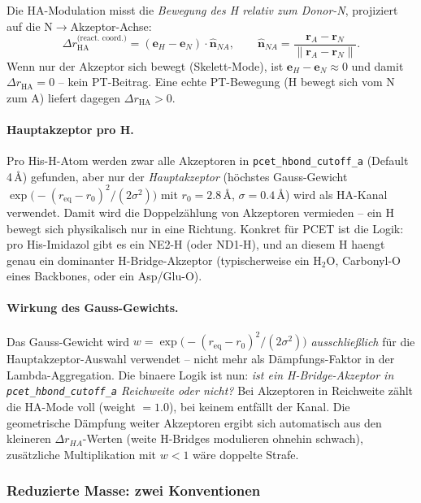 \documentclass[11pt,a4paper,twoside]{article}
\theoremstyle{remark}
\begin{document}
Die HA-Modulation misst die
\emph{Bewegung des H relativ zum Donor-N}, projiziert auf die
N$\to$Akzeptor-Achse:
\begin{equation}
  \Delta r_\text{HA}^\text{(react.\ coord.)}
  = (\mathbf{e}_H - \mathbf{e}_N) \cdot \hat{\mathbf{n}}_{NA},
  \qquad
  \hat{\mathbf{n}}_{NA} = \frac{\mathbf{r}_A - \mathbf{r}_N}{\|\mathbf{r}_A - \mathbf{r}_N\|}.
  \label{eq:dr-reaction-coord}
\end{equation}
Wenn nur der Akzeptor sich bewegt (Skelett-Mode), ist
$\mathbf{e}_H - \mathbf{e}_N \approx 0$ und damit
$\Delta r_\text{HA} = 0$ -- kein PT-Beitrag. Eine echte PT-Bewegung
(H bewegt sich vom N zum A) liefert dagegen $\Delta r_\text{HA} > 0$.

\paragraph{Hauptakzeptor pro H.}
Pro His-H-Atom werden zwar alle Akzeptoren in
\texttt{pcet\_hbond\_cutoff\_a} (Default 4\,\AA) gefunden, aber nur
der \emph{Hauptakzeptor} (h\"ochstes Gauss-Gewicht
$\exp\bigl(-(r_{\text{eq}} - r_0)^2/(2\sigma^2)\bigr)$ mit
$r_0 = 2.8$\,\AA, $\sigma = 0.4$\,\AA) wird als HA-Kanal verwendet.
Damit wird die Doppelz\"ahlung von Akzeptoren vermieden -- ein
H bewegt sich physikalisch nur in eine Richtung. Konkret f\"ur PCET ist
die Logik: pro His-Imidazol gibt es ein NE2-H (oder ND1-H), und an
diesem H haengt genau ein dominanter H-Bridge-Akzeptor (typischerweise
ein H$_2$O, Carbonyl-O eines Backbones, oder ein Asp/Glu-O).

\paragraph{Wirkung des Gauss-Gewichts.}
Das Gauss-Gewicht wird
$w = \exp\bigl(-(r_{\text{eq}} - r_0)^2/(2\sigma^2)\bigr)$
\emph{ausschlie{\ss}lich} f\"ur die Hauptakzeptor-Auswahl verwendet --
nicht mehr als D\"ampfungs-Faktor in der Lambda-Aggregation. Die binaere
Logik ist nun: \emph{ist ein H-Bridge-Akzeptor in
\texttt{pcet\_hbond\_cutoff\_a} Reichweite oder nicht?} Bei Akzeptoren
in Reichweite z\"ahlt die HA-Mode voll (weight $= 1.0$), bei keinem
entf\"allt der Kanal. Die geometrische D\"ampfung weiter Akzeptoren
ergibt sich automatisch aus den kleineren $\Delta r_{HA}$-Werten
(weite H-Bridges modulieren ohnehin schwach), zus\"atzliche
Multiplikation mit $w < 1$ w\"are doppelte Strafe.

\subsubsection*{Reduzierte Masse: zwei Konventionen}
\end{document}

